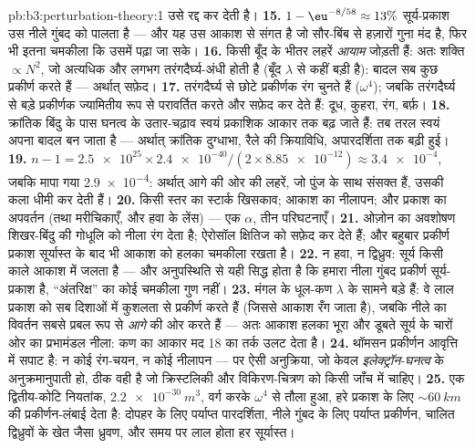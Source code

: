 \begin{solution}{pb:b3:perturbation-theory:1}
उसे रद्द कर देती है।
\textbf{15.} $1 - \eu^{-8/58} \approx 13\%$ सूर्य-प्रकाश उस नीले
गुंबद को पालता है --- और यह उस आकाश से संगत है जो सौर-बिंब से हज़ारों
गुना मंद है, फिर भी इतना चमकीला कि उसमें पढ़ा जा सके।
\textbf{16.} किसी बूँद के भीतर लहरें \emph{आयाम} जोड़ती हैं:
अतः शक्ति $\propto N^2$, जो अत्यधिक और लगभग तरंगदैर्घ्य-अंधी होती है
(बूँद $\lambda$ से कहीं बड़ी है): बादल सब कुछ प्रकीर्ण करते हैं ---
अर्थात् सफ़ेद।
\textbf{17.} तरंगदैर्घ्य से छोटे प्रकीर्णक रंग चुनते हैं
($\omega^4$); जबकि तरंगदैर्घ्य से बड़े प्रकीर्णक ज्यामितीय रूप से
परावर्तित करते और सफ़ेद कर देते हैं: दूध, कुहरा, रंग, बर्फ़।
\textbf{18.} क्रांतिक बिंदु के पास घनत्व के उतार-चढ़ाव स्वयं
प्रकाशिक आकार तक बढ़ जाते हैं: तब तरल स्वयं अपना बादल बन जाता है
--- अर्थात् क्रांतिक दुग्धाभा, रैले की क्रियाविधि, अपारदर्शिता तक
बढ़ी हुई।
\textbf{19.} $n - 1 = \num{2.5e25} \times \num{2.4e-40}/(2 \times
\num{8.85e-12}) \approx \num{3.4e-4}$, जबकि मापा गया
\num{2.9e-4}: अर्थात् आगे की ओर की लहरें, जो पुंज के साथ संसक्त हैं,
उसकी कला धीमी कर देती हैं।
\textbf{20.} किसी स्तर का स्टार्क खिसकाव; आकाश का नीलापन; और
प्रकाश का अपवर्तन (तथा मरीचिकाएँ, और हवा के लेंस) --- एक
$\alpha$, तीन परिघटनाएँ।
\textbf{21.} ओज़ोन का अवशोषण शिखर-बिंदु की गोधूलि को नीला रंग देता है;
ऐरोसॉल क्षितिज को सफ़ेद कर देते हैं; और बहुबार प्रकीर्ण प्रकाश
सूर्यास्त के बाद भी आकाश को हलका चमकीला रखता है।
\textbf{22.} न हवा, न द्विध्रुव: सूर्य किसी काले आकाश में जलता है
--- और अनुपस्थिति से यही सिद्ध होता है कि हमारा नीला गुंबद प्रकीर्ण
सूर्य-प्रकाश है, ``अंतरिक्ष'' का कोई चमकीला गुण नहीं।
\textbf{23.} मंगल के धूल-कण $\lambda$ के सामने बड़े हैं:
वे लाल प्रकाश को सब दिशाओं में कुशलता से प्रकीर्ण करते हैं (जिससे
आकाश रँग जाता है), जबकि नीले का विवर्तन सबसे प्रबल रूप से \emph{आगे}
की ओर करते हैं --- अतः आकाश हलका भूरा और डूबते सूर्य के चारों ओर का
प्रभामंडल नीला: कण का आकार मद 18 का तर्क उलट देता है।
\textbf{24.} थॉमसन प्रकीर्णन आवृत्ति में सपाट है: न कोई
रंग-चयन, न कोई नीलापन --- पर ऐसी अनुक्रिया, जो केवल
\emph{इलेक्ट्रॉन-घनत्व} के अनुक्रमानुपाती हो, ठीक वही है जो
क्रिस्टलिकी और विकिरण-चित्रण को किसी जाँच में चाहिए।
\textbf{25.} एक द्वितीय-कोटि नियतांक, $\qty{2.2e-30}{m^3}$,
वर्ग करके $\omega^4$ से तौला हुआ, हरे प्रकाश के लिए $\sim\qty{60}{km}$
की प्रकीर्णन-लंबाई देता है: दोपहर के लिए पर्याप्त पारदर्शिता,
नीले गुंबद के लिए पर्याप्त प्रकीर्णन, चालित द्विध्रुवों के खेत जैसा
ध्रुवण, और समय पर लाल होता हर सूर्यास्त।
\end{solution}
